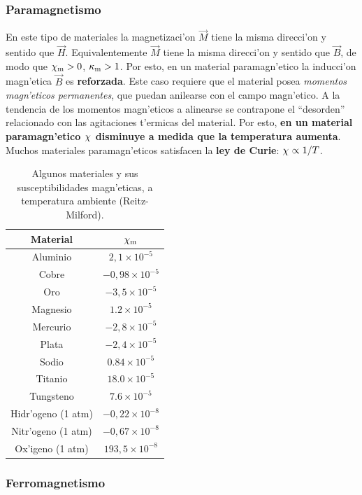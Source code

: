 \subsubsection{Paramagnetismo}
 En este tipo de materiales la magnetizaci'on $\vec{M}$
tiene la misma direcci'on y sentido que $\vec{H}$. Equivalentemente $\vec{M}$
tiene la misma direcci'on y sentido que $\vec{B}$, de modo que
$\chi_{\rm m}>0$, $\kappa_{\rm m}>1$. Por esto, en un material paramagn'etico la inducci'on magn'etica $\vec{B}$ es \textbf{reforzada}. Este caso requiere que el material posea \textit{momentos magn'eticos permanentes}, que puedan anilearse con el campo magn'etico.
A la tendencia de los momentos magn'eticos a alinearse se
contrapone el ``desorden'' relacionado con las agitaciones t'ermicas del
material. Por esto, \textbf{en un material paramagn'etico $\chi_{\rm}$ disminuye a
medida que la temperatura aumenta}. Muchos materiales paramagn'eticos satisfacen
la \textbf{ley de Curie}: $\chi_{\rm}\propto 1/T$.
\begin{table}[h!]
\begin{center}
\begin{tabular}{c|c}
Material & $\chi_{\rm m}$ \\ \hline\hline
Aluminio & $2,1\times 10^{-5}$ \\
Cobre & $-0,98\times 10^{-5}$ \\
Oro & $-3,5\times 10^{-5}$ \\
Magnesio & $1.2\times 10^{-5}$ \\
Mercurio & $-2,8\times 10^{-5}$ \\
Plata & $-2,4\times 10^{-5}$ \\
Sodio & $0.84\times 10^{-5}$ \\
Titanio & $18.0\times 10^{-5}$ \\
Tungsteno & $7.6\times 10^{-5}$ \\
Hidr'ogeno (1 atm) & $-0,22\times 10^{-8}$ \\
Nitr'ogeno (1 atm) & $-0,67\times 10^{-8}$ \\
Ox'igeno (1 atm) & $193,5\times 10^{-8}$
\end{tabular}
\caption{Algunos materiales y sus susceptibilidades magn'eticas, a temperatura ambiente (Reitz-Milford).}
\end{center}
\end{table}

\subsubsection{Ferromagnetismo}

